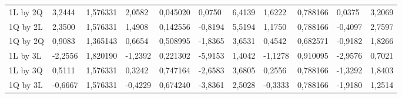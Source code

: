 \begin{table}[H]
{\begin{tabular}{lllllllllll}
\rowcolor[HTML]{FFFFFF} 
{\color[HTML]{000000} 1L by 2Q}       & {\color[HTML]{FF0000} 3,2444}   & {\color[HTML]{FF0000} 1,576331} & {\color[HTML]{FF0000} 2,0582}   & {\color[HTML]{FF0000} 0,045020} & {\color[HTML]{FF0000} 0,0750}         & {\color[HTML]{FF0000} 6,4139}         & {\color[HTML]{FF0000} 1,6222}   & {\color[HTML]{FF0000} 0,788166}      & {\color[HTML]{FF0000} 0,0375}         & {\color[HTML]{FF0000} 3,2069}         \\
\rowcolor[HTML]{FFFFFF} 
{\color[HTML]{000000} 1Q by 2L}       & {\color[HTML]{000000} 2,3500}   & {\color[HTML]{000000} 1,576331} & {\color[HTML]{000000} 1,4908}   & {\color[HTML]{000000} 0,142556} & {\color[HTML]{000000} -0,8194}        & {\color[HTML]{000000} 5,5194}         & {\color[HTML]{000000} 1,1750}   & {\color[HTML]{000000} 0,788166}      & {\color[HTML]{000000} -0,4097}        & {\color[HTML]{000000} 2,7597}         \\
\rowcolor[HTML]{FFFFFF} 
{\color[HTML]{000000} 1Q by 2Q}       & {\color[HTML]{000000} 0,9083}   & {\color[HTML]{000000} 1,365143} & {\color[HTML]{000000} 0,6654}   & {\color[HTML]{000000} 0,508995} & {\color[HTML]{000000} -1,8365}        & {\color[HTML]{000000} 3,6531}         & {\color[HTML]{000000} 0,4542}   & {\color[HTML]{000000} 0,682571}      & {\color[HTML]{000000} -0,9182}        & {\color[HTML]{000000} 1,8266}         \\
\rowcolor[HTML]{FFFFFF} 
{\color[HTML]{000000} 1L by 3L}       & {\color[HTML]{000000} -2,2556}  & {\color[HTML]{000000} 1,820190} & {\color[HTML]{000000} -1,2392}  & {\color[HTML]{000000} 0,221302} & {\color[HTML]{000000} -5,9153}        & {\color[HTML]{000000} 1,4042}         & {\color[HTML]{000000} -1,1278}  & {\color[HTML]{000000} 0,910095}      & {\color[HTML]{000000} -2,9576}        & {\color[HTML]{000000} 0,7021}         \\
\rowcolor[HTML]{FFFFFF} 
{\color[HTML]{000000} 1L by 3Q}       & {\color[HTML]{000000} 0,5111}   & {\color[HTML]{000000} 1,576331} & {\color[HTML]{000000} 0,3242}   & {\color[HTML]{000000} 0,747164} & {\color[HTML]{000000} -2,6583}        & {\color[HTML]{000000} 3,6805}         & {\color[HTML]{000000} 0,2556}   & {\color[HTML]{000000} 0,788166}      & {\color[HTML]{000000} -1,3292}        & {\color[HTML]{000000} 1,8403}         \\
\rowcolor[HTML]{FFFFFF} 
{\color[HTML]{000000} 1Q by 3L}       & {\color[HTML]{000000} -0,6667}  & {\color[HTML]{000000} 1,576331} & {\color[HTML]{000000} -0,4229}  & {\color[HTML]{000000} 0,674240} & {\color[HTML]{000000} -3,8361}        & {\color[HTML]{000000} 2,5028}         & {\color[HTML]{000000} -0,3333}  & {\color[HTML]{000000} 0,788166}      & {\color[HTML]{000000} -1,9180}        & {\color[HTML]{000000} 1,2514}         \\

\end{tabular}}
\end{table}
